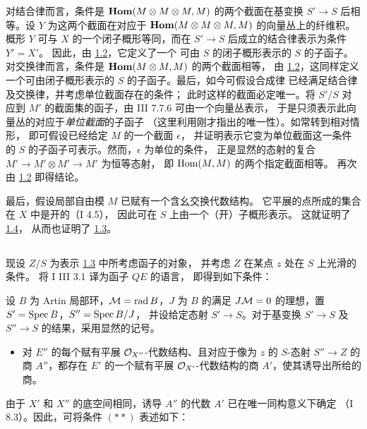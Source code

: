 对结合律而言，条件是
$\operatorname{\mathbf{Hom}}(M\otimes M\otimes M,M)$ 的两个截面在基变换
$S'\rightarrow S$ 后相等。设 $Y$ 为这两个截面在对应于
$\operatorname{\mathbf{Hom}}(M\otimes M\otimes M,M)$ 的向量丛上的纤维积。
概形 $Y$ 可与 $X$ 的一个闭子概形等同，而在
$S'\rightarrow S$ 后成立的结合律表示为条件 $Y'=X'$。
因此，由 \hyperref[XIII.lem1.2]{1.2}，它定义了一个
可由 $S$ 的闭子概形表示的 $S$ 的子函子。
对交换律而言，条件是 $\operatorname{\mathbf{Hom}}(M\otimes M,M)$ 的两个截面相等，
由 \hyperref[XIII.lem1.2]{1.2}，这同样定义一个可由闭子概形表示的
$S$ 的子函子。最后，如今可假设合成律
已经满足结合律及交换律，并考虑单位截面存在的条件；
此时这样的截面必定唯一。将 $S'/S$ 对应到
$M'$ 的截面集的函子，由 \EGA III 7.7.6 可由一个向量丛表示，
于是只须表示此向量丛的对应于\emph{单位截面}的子函子
（这里利用刚才指出的唯一性）。如常转到相对情形，
即可假设已经给定 $M$ 的一个截面 $\epsilon$，
并证明表示它变为\pageoriginale 单位截面这一条件的
$S$ 的子函子可表示。然而，$\epsilon$ 为单位的条件，
正是显然的态射的复合
$M'\rightarrow M'\otimes M'\rightarrow M'$ 为恒等态射，
即 $\operatorname{Hom}(M,M)$ 的两个指定截面相等。
再次由 \hyperref[XIII.lem1.2]{1.2} 即得结论。

最后，假设局部自由模 $M$ 已赋有一个含幺交换代数结构。
它平展的点所成的集合在 $X$ 中是开的（\SGA I 4.5），
因此可在 $S$ 上由一个（开）子概形表示。
这就证明了 \hyperref[XIII.lem1.4]{1.4}，
从而也证明了 \hyperref[XIII.lem1.3]{1.3}。

\setcounter{subsection}{4}
\subsection{}
现设 $Z/S$ 为表示 \hyperref[XIII.lem1.3]{1.3} 中所考虑函子的对象，
并考虑 $Z$ 在某点 $z$ 处在 $S$ 上光滑的条件。
将 \SGA I III 3.1 译为函子 $QE$ 的语言，
即得到如下条件：

设 $B$ 为 Artin 局部环，${\mathcal M}=\operatorname{rad} B$，$J$ 为
$B$ 的满足 $J{\mathcal M}=0$ 的理想，置 $S'=\operatorname{Spec} B$，$S''=\operatorname{Spec} B/J$，
并设给定态射 $S'\rightarrow S$。对于基变换
$S'\rightarrow S$ 及 $S''\rightarrow S$ 的结果，采用显然的记号。

\begin{itemize}
\item[$(\ast)$] 对 $E''$ 的每个赋有平展
${\mathcal O}_{X''}$-代数结构、且对应于像为 $z$ 的
$S$-态射 $S''\rightarrow Z$ 的商 $A''$，都存在
$E'$ 的一个赋有平展 ${\mathcal O}_{X'}$-代数结构的商
$A'$，使其诱导出所给的商。
\end{itemize}

由于 $X'$ 和 $X''$ 的底空间相同，诱导
$A''$ 的代数 $A'$ 已在唯一同构意义下确定
（\SGA I 8.3）。\pageoriginale 因此，可将条件
$({\ast}{\ast})$ 表述如下：

